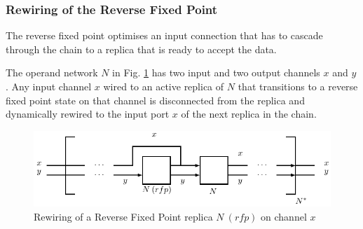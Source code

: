 %
%
%
%
%
%
%


    \subsubsection*{Rewiring of the Reverse Fixed Point}
The reverse fixed point optimises an input connection that has to cascade through the chain to a replica that is ready to accept the data.

The operand network $N$ in Fig. \ref{fig:rfp_wiring} has two input and two output channels $x$ and $y$. Any input channel $x$ wired to an active replica of $N$ that transitions to a reverse fixed point state on that channel is disconnected from the replica and dynamically rewired to the input port $x$ of the next replica in the chain.
\begin{figure}[h!]
\centering
\includegraphics[scale=0.8]{figs/chapter_04_rfp_wiring.pdf}
\caption{Rewiring of a Reverse Fixed Point replica $N\:(rfp)$ on channel $x$}
\label{fig:rfp_wiring}
\end{figure}

